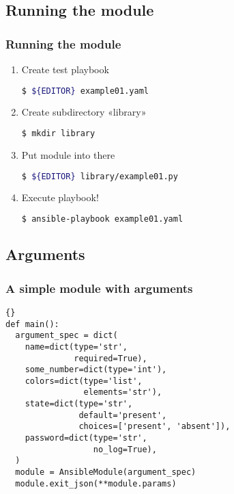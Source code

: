 \documentclass{beamer}
\begin{document}
  \subsection{Running the module}
  \begin{frame}[fragile]
    \frametitle{Running the module}
    \begin{enumerate}
      \item Create test playbook

\begin{lstlisting}[language=bash, numbers=none]
$ ${EDITOR} example01.yaml
\end{lstlisting}
      \item Create subdirectory «library»

\begin{lstlisting}[language=bash, numbers=none]
$ mkdir library
\end{lstlisting}
      \item Put module into there

\begin{lstlisting}[language=bash, numbers=none]
$ ${EDITOR} library/example01.py
\end{lstlisting}
      \item Execute playbook!

\begin{lstlisting}[language=bash, numbers=none]
$ ansible-playbook example01.yaml
\end{lstlisting}
    \end{enumerate}
  \end{frame}

  \subsection{Arguments}
  \begin{frame}[fragile]
    \frametitle{A simple module with arguments}
\begin{lstlisting}{}
def main():
  argument_spec = dict(
    name=dict(type='str',
              required=True),
    some_number=dict(type='int'),
    colors=dict(type='list',
                elements='str'),
    state=dict(type='str',
               default='present',
               choices=['present', 'absent']),
    password=dict(type='str',
                  no_log=True),
  )
  module = AnsibleModule(argument_spec)
  module.exit_json(**module.params)
\end{lstlisting}
  \end{frame}
\end{document}
